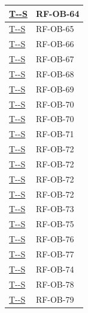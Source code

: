 \documentclass[a4paper,12pt]{article}
\newcounter{testsys}
\newcommand{\systestref}{%
  \hyperlink{T-\arabic{testsys}-S}{T-\arabic{testsys}-S}%
}
\begin{document}
\begin{longtable}{|>{\centering\arraybackslash}p{5cm}|>{\centering\arraybackslash}p{9cm}|}
\stepcounter{testsys}
\systestref & RF-OB-64 \\
\hline

\stepcounter{testsys}
\systestref & RF-OB-65 \\
\hline

\stepcounter{testsys}
\systestref & RF-OB-66 \\
\hline

\stepcounter{testsys}
\systestref & RF-OB-67 \\
\hline

\stepcounter{testsys}
\systestref & RF-OB-68 \\
\hline

\stepcounter{testsys}
\systestref & RF-OB-69 \\
\hline

\stepcounter{testsys}
\systestref & RF-OB-70 \\
\hline

\stepcounter{testsys}
\systestref & RF-OB-70 \\
\hline

\stepcounter{testsys}
\systestref & RF-OB-71 \\
\hline

\stepcounter{testsys}
\systestref & RF-OB-72 \\
\hline

\stepcounter{testsys}
\systestref & RF-OB-72 \\
\hline

\stepcounter{testsys}
\systestref & RF-OB-72 \\
\hline

\stepcounter{testsys}
\systestref & RF-OB-72 \\
\hline

\stepcounter{testsys}
\systestref & RF-OB-73 \\
\hline

\stepcounter{testsys}
\systestref & RF-OB-75 \\
\hline

\stepcounter{testsys}
\systestref & RF-OB-76 \\
\hline

\stepcounter{testsys}
\systestref & RF-OB-77 \\
\hline

\stepcounter{testsys}
\systestref & RF-OB-74 \\
\hline

\stepcounter{testsys}
\systestref & RF-OB-78 \\
\hline

\stepcounter{testsys}
\systestref & RF-OB-79 \\
\hline


\end{longtable}
\end{document}
